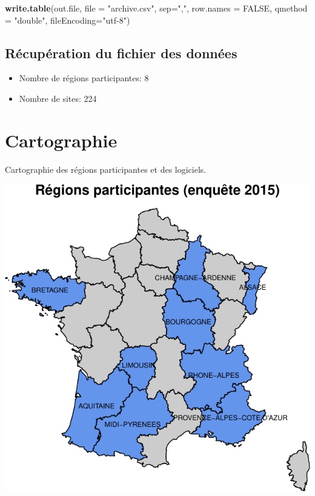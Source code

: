 \documentclass[]{article}
\newenvironment{Shaded}{\begin{snugshade}}{\end{snugshade}}
\newcommand{\KeywordTok}[1]{\textcolor[rgb]{0.13,0.29,0.53}{\textbf{{#1}}}}
\newcommand{\DataTypeTok}[1]{\textcolor[rgb]{0.13,0.29,0.53}{{#1}}}
\newcommand{\StringTok}[1]{\textcolor[rgb]{0.31,0.60,0.02}{{#1}}}
\newcommand{\OtherTok}[1]{\textcolor[rgb]{0.56,0.35,0.01}{{#1}}}
\newcommand{\NormalTok}[1]{{#1}}
\begin{document}
\begin{Shaded}
\begin{Highlighting}[]
\KeywordTok{write.table}\NormalTok{(out.file, }\DataTypeTok{file =} \StringTok{"archive.csv"}\NormalTok{, }\DataTypeTok{sep=}\StringTok{","}\NormalTok{, }\DataTypeTok{row.names =} \OtherTok{FALSE}\NormalTok{, }\DataTypeTok{qmethod =} \StringTok{"double"}\NormalTok{, }\DataTypeTok{fileEncoding=}\StringTok{"utf-8"}\NormalTok{)}
\end{Highlighting}
\end{Shaded}

\subsection{Récupération du fichier des
données}\label{recuperation-du-fichier-des-donnees}

\begin{itemize}
\itemsep1pt\parskip0pt
\item
  Nombre de régions participantes: 8
\item
  Nombre de sites: 224
\end{itemize}

\section{Cartographie}\label{cartographie}

Cartographie des régions participantes et des logiciels.

\includegraphics{septembre2015_files/figure-latex/carto_region-1.pdf}
\end{document}
